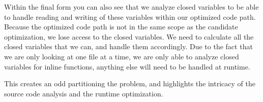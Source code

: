 Within the final form you can also see that we analyze closed variables to be able to handle reading and writing of these variables within our optimized code path. Because the optimized code path is not in the same scope as the candidate optimization, we lose access to the closed variables.  We need to calculate all the closed variables that we can, and handle them accordingly.  Due to the fact that we are only looking at one file at a time, we are only able to analyze closed variables for inline functions, anything else will need to be handled at runtime.  



This creates an odd partitioning the problem, and highlights the intricacy of the source code analysis and the runtime optimization.  